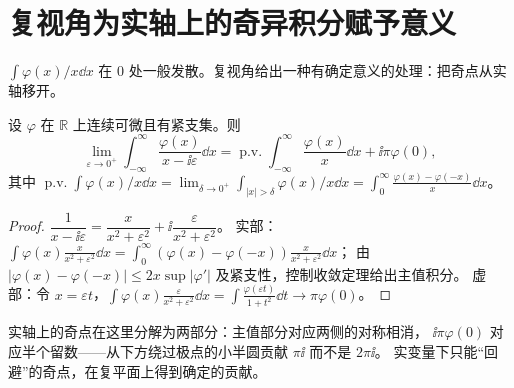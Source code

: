 \documentclass[11pt]{article}
\DeclareMathOperator{\PV}{p.v.}
\begin{document}
\section{复视角为实轴上的奇异积分赋予意义}
$\int\varphi(x)/x\dd x$ 在 $0$ 处一般发散。复视角给出一种有确定意义的处理：把奇点从实轴移开。
\begin{proposition}\label{prop:plemelj}
设 $\varphi$ 在 $\mathbb R$ 上连续可微且有紧支集。则
\[
 \lim_{\varepsilon\to0^+}\int_{-\infty}^{\infty}\frac{\varphi(x)}{x-\ii\varepsilon}\dd x
 =\PV\!\int_{-\infty}^{\infty}\frac{\varphi(x)}x\dd x+\ii\pi\varphi(0),
\]
其中 $\PV\!\int\varphi(x)/x\dd x=\lim_{\delta\to0^+}\int_{|x|>\delta}\varphi(x)/x\dd x=\int_0^\infty\frac{\varphi(x)-\varphi(-x)}x\dd x$。
\end{proposition}
\begin{proof}
$\dfrac1{x-\ii\varepsilon}=\dfrac{x}{x^2+\varepsilon^2}+\ii\dfrac{\varepsilon}{x^2+\varepsilon^2}$。
实部：$\int\varphi(x)\frac{x}{x^2+\varepsilon^2}\dd x=\int_0^\infty(\varphi(x)-\varphi(-x))\frac{x}{x^2+\varepsilon^2}\dd x$；
由 $|\varphi(x)-\varphi(-x)|\le2x\sup|\varphi'|$ 及紧支性，控制收敛定理给出主值积分。
虚部：令 $x=\varepsilon t$，$\int\varphi(x)\frac{\varepsilon}{x^2+\varepsilon^2}\dd x=\int\frac{\varphi(\varepsilon t)}{1+t^2}\dd t\to\pi\varphi(0)$。
\end{proof}
实轴上的奇点在这里分解为两部分：主值部分对应两侧的对称相消，
$\ii\pi\varphi(0)$ 对应半个留数——从下方绕过极点的小半圆贡献 $\pi\ii$ 而不是 $2\pi\ii$。
实变量下只能“回避”的奇点，在复平面上得到确定的贡献。
\end{document}
